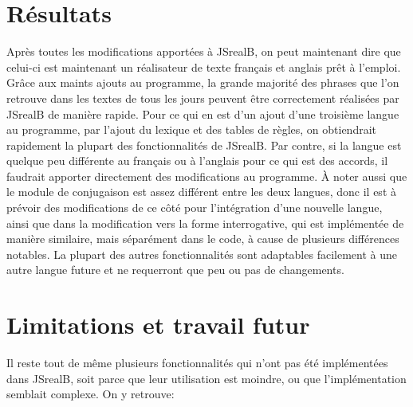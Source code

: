 \documentclass[11pt]{article} %
\newcommand{\system}[1]{\textsf{#1}}
\newcommand{\JSB}{\system{JSrealB}}
\begin{document}
\section{Résultats}
Après toutes les modifications apportées à \JSB{}, on peut maintenant
dire que celui-ci est maintenant un réalisateur de texte français et anglais
prêt à l'emploi. Grâce aux maints ajouts au programme, la grande majorité
des phrases que l'on retrouve dans les textes de tous les jours peuvent
être correctement réalisées par \JSB{} de manière rapide. Pour ce
qui en est d'un ajout d'une troisième langue au programme, par l'ajout
du lexique et des tables de règles, on obtiendrait rapidement la plupart
des fonctionnalités de \JSB{}. Par contre, si la langue est quelque
peu différente au français ou à l'anglais pour ce qui est des accords,
il faudrait apporter directement des modifications au programme. À
noter aussi que le module de conjugaison est assez différent entre
les deux langues, donc il est à prévoir des modifications de ce côté
pour l'intégration d'une nouvelle langue, ainsi que dans la modification
vers la forme interrogative, qui est implémentée de manière similaire,
mais séparément dans le code, à cause de plusieurs différences notables.
La plupart des autres fonctionnalités sont adaptables facilement à
une autre langue future et ne requerront que peu ou pas de changements.

\section{Limitations et travail futur}
Il reste tout de même plusieurs fonctionnalités qui n'ont pas été
implémentées dans \JSB{}, soit parce que leur utilisation est moindre,
ou que l'implémentation semblait complexe. On y retrouve:
\end{document}
